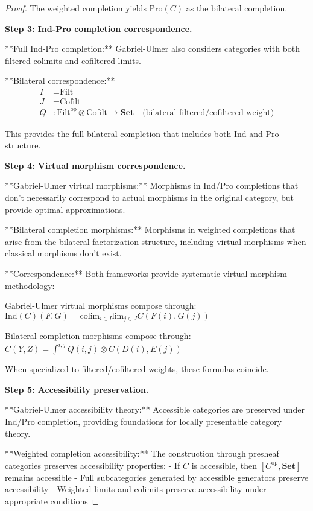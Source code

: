 \documentclass[11pt]{article}
\theoremstyle{plain}
\theoremstyle{definition}
\theoremstyle{remark}
\newcommand{\op}{\mathrm{op}}
\newcommand{\colim}{\mathrm{colim}}
\renewcommand{\lim}{\mathrm{lim}}
\newcommand{\wh}[1]{\widehat{#1}}
\begin{document}
\begin{proof}
The weighted completion yields $\text{Pro}(C)$ as the bilateral completion.

\textbf{Step 3: Ind-Pro completion correspondence.}

**Full Ind-Pro completion:** Gabriel-Ulmer also considers categories with both filtered colimits and cofiltered limits.

**Bilateral correspondence:**
\begin{align}
I &= \text{Filt} \\
J &= \text{Cofilt} \\
Q &: \text{Filt}^{\op} \otimes \text{Cofilt} \to \mathbf{Set} \quad \text{(bilateral filtered/cofiltered weight)}
\end{align}

This provides the full bilateral completion that includes both Ind and Pro structure.

\textbf{Step 4: Virtual morphism correspondence.}

**Gabriel-Ulmer virtual morphisms:** Morphisms in Ind/Pro completions that don't necessarily correspond to actual morphisms in the original category, but provide optimal approximations.

**Bilateral completion morphisms:** Morphisms in weighted completions that arise from the bilateral factorization structure, including virtual morphisms when classical morphisms don't exist.

**Correspondence:** Both frameworks provide systematic virtual morphism methodology:

Gabriel-Ulmer virtual morphisms compose through:
$\text{Ind}(C)(F, G) = \colim_{i \in I} \lim_{j \in J} C(F(i), G(j))$

Bilateral completion morphisms compose through:
$\wh{C}(Y, Z) = \int^{i,j} Q(i,j) \otimes C(D(i), E(j))$

When specialized to filtered/cofiltered weights, these formulas coincide.

\textbf{Step 5: Accessibility preservation.}

**Gabriel-Ulmer accessibility theory:** Accessible categories are preserved under Ind/Pro completion, providing foundations for locally presentable category theory.

**Weighted completion accessibility:** The construction through presheaf categories preserves accessibility properties:
- If $C$ is accessible, then $[C^{\op}, \mathbf{Set}]$ remains accessible
- Full subcategories generated by accessible generators preserve accessibility
- Weighted limits and colimits preserve accessibility under appropriate conditions


\end{proof}
\end{document}
